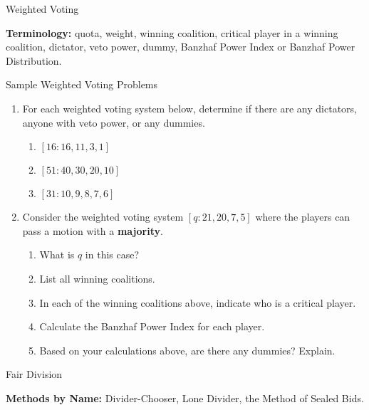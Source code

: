 \documentclass[12pt]{article}
\renewcommand{\emph}[1]{\textsf{\textbf{#1}}}
\begin{document}
\begin{center} {\Large{Weighted Voting}} \\ \end{center}

\noindent\textbf{Terminology:} quota, weight, winning coalition, critical player in a winning coalition, dictator, veto power, dummy, Banzhaf Power Index or Banzhaf Power Distribution.

\begin{center} {\Large{Sample Weighted Voting Problems}}  \end{center}
\begin{enumerate}
\item For each weighted voting system below, determine if there are any dictators, anyone with veto power, or any dummies.
	\begin{enumerate}
	\item $[16:16,11,3,1]$
	\vfill
	\item $[51:40,30,20,10]$
	\vfill
	\item $[31:10,9,8,7,6]$
	\vfill
	\end{enumerate}
\item Consider the weighted voting system $[q:21,20,7,5]$ where the players can pass a motion with a \emph{majority}.
	\begin{enumerate}
	\item What is $q$ in this case?\\
	\item List all winning coalitions.
	\vfill
	\item In each of the winning coalitions above, indicate who is a critical player.
	
	\item Calculate the Banzhaf Power Index for each player.
	\vfill
	\item Based on your calculations above, are there any dummies? Explain.
	\end{enumerate}
\end{enumerate}
\newpage	
\begin{center} {\Large{Fair Division}}  \end{center}

\noindent\textbf{Methods by Name:} Divider-Chooser, Lone Divider, the Method of Sealed Bids.
\end{document}
